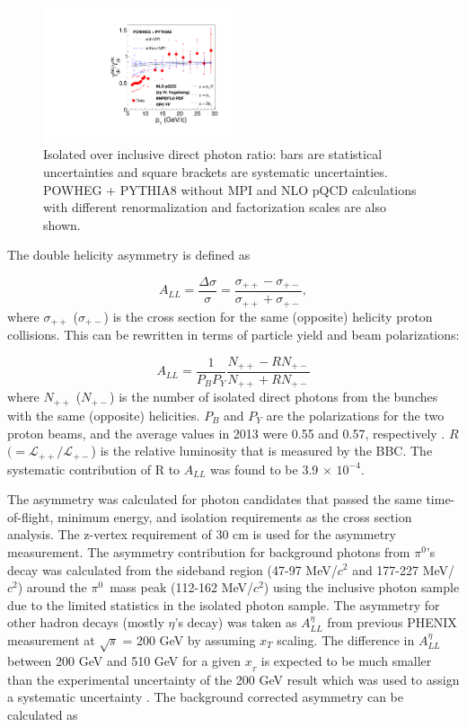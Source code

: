 \documentclass[twocolumn,letterpaper,aps,prl,longbibliography,superscriptaddress,floatfix]{revtex4-2}
\newcommand{\pizero}{\ensuremath{\pi^0}}
\begin{document}
\begin{figure}
\centering
\includegraphics[width=0.5\textwidth]{Iso2Inc}
\caption{Isolated over inclusive direct photon ratio: bars are statistical uncertainties and square brackets are systematic uncertainties. POWHEG + PYTHIA8 without MPI and NLO pQCD calculations with different renormalization and factorization scales are also shown.}
\label{fig:iso2inc}
\end{figure}

The double helicity asymmetry is defined as

\begin{equation} \label{eq:all}
A_{LL} = \frac{\Delta\sigma}{\sigma} = \frac{\sigma_{++}-\sigma_{+-}}{\sigma_{++}+\sigma_{+-}},
\end{equation}
where $\sigma_{++}$ ($\sigma_{+-}$) is the cross section for the same (opposite) helicity proton collisions. This can be rewritten in terms of particle yield and beam polarizations:

\begin{equation}
A_{LL} = \frac{1}{P_BP_Y} \frac{N_{++}-RN_{+-}}{N_{++}+RN_{+-}}
\end{equation}
where $N_{++}$ ($N_{+-}$) is the number of isolated direct photons from the bunches with the same (opposite) helicities. $P_{B}$ and $P_{Y}$ are the polarizations for the two proton beams, and the average values in 2013 were 0.55 and 0.57, respectively \cite{POBLAGUEV2020164261}. $R$ $(= \mathcal{L_{++}}/\mathcal{L_{+-}}$) is the relative luminosity that is measured by the BBC. The systematic contribution of R to $A_{LL}$ was found to be 3.9 $\times$ $10^{-4}$.

The asymmetry was calculated for photon candidates that passed the same time-of-flight, minimum energy, and isolation requirements as the cross section analysis. The z-vertex requirement of 30 cm is used for the asymmetry measurement. The asymmetry contribution for background photons from \pizero's decay was calculated from the sideband region (47-97 MeV/$c^2$ and 177-227 MeV/$c^2$) around the \pizero\ mass peak (112-162 MeV/$c^2$) using the inclusive photon sample due to the limited statistics in the isolated photon sample. The asymmetry for other hadron decays (mostly $\eta$'s decay) was taken as $A_{LL}^{\eta}$ from previous PHENIX measurement at $\sqrt{s}$ = 200 GeV \cite{PhysRevD.90.012007} by assuming $x_T$ scaling. The difference in $A^{\eta}_{LL}$ between 200 GeV and 510 GeV for a given $x_{_{T}}$ is expected to be much smaller than the experimental uncertainty of the 200 GeV result which was used to assign a systematic uncertainty \cite{PhysRevLett.113.012001, 2014276}. The background corrected asymmetry can be calculated as
\end{document}
